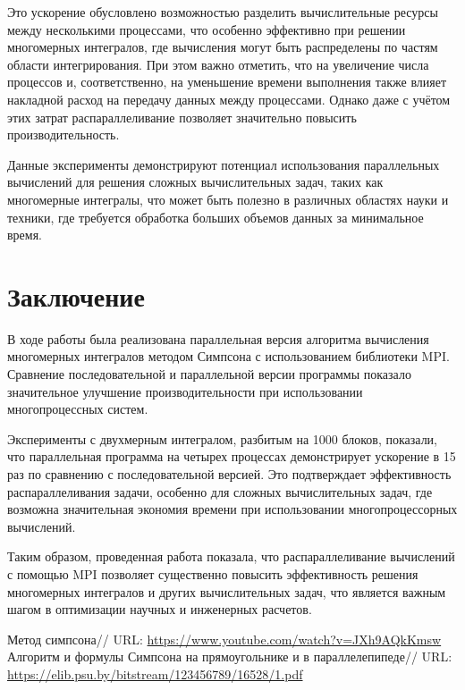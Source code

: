 \documentclass{report}
\begin{document}
Это ускорение обусловлено возможностью разделить вычислительные ресурсы между несколькими процессами, что особенно эффективно при решении многомерных интегралов, где вычисления могут быть распределены по частям области интегрирования. При этом важно отметить, что на увеличение числа процессов и, соответственно, на уменьшение времени выполнения также влияет накладной расход на передачу данных между процессами. Однако даже с учётом этих затрат распараллеливание позволяет значительно повысить производительность.

Данные эксперименты демонстрируют потенциал использования параллельных вычислений для решения сложных вычислительных задач, таких как многомерные интегралы, что может быть полезно в различных областях науки и техники, где требуется обработка больших объемов данных за минимальное время.

\section*{Заключение}

В ходе работы была реализована параллельная версия алгоритма вычисления многомерных интегралов методом Симпсона с использованием библиотеки MPI. Сравнение последовательной и параллельной версии программы показало значительное улучшение производительности при использовании многопроцессных систем.

Эксперименты с двухмерным интегралом, разбитым на 1000 блоков, показали, что параллельная программа на четырех процессах демонстрирует ускорение в 15 раз по сравнению с последовательной версией. Это подтверждает эффективность распараллеливания задачи, особенно для сложных вычислительных задач, где возможна значительная экономия времени при использовании многопроцессорных вычислений.

Таким образом, проведенная работа показала, что распараллеливание вычислений с помощью MPI позволяет существенно повысить эффективность решения многомерных интегралов и других вычислительных задач, что является важным шагом в оптимизации научных и инженерных расчетов.

\newpage

\begin{thebibliography}{1}
   Метод симпсона// URL: \url{https://www.youtube.com/watch?v=JXh9AQkKmsw}
   Алгоритм и формулы Симпсона на прямоугольнике и в параллелепипеде// URL: \url{https://elib.psu.by/bitstream/123456789/16528/1.pdf}
  \end{thebibliography}
\newpage
\end{document}
